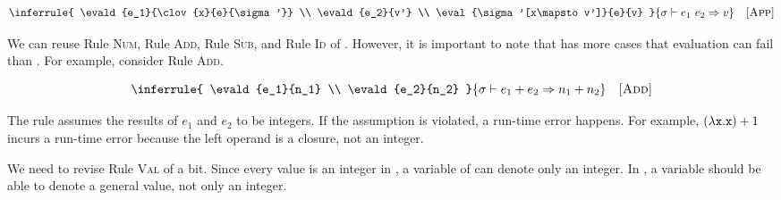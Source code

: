 
\vspace{-1em}

\[
  \inferrule
  {
    \evald{e_1}{\clov{x}{e}{\sigma'}} \\
    \evald{e_2}{v'} \\
    \eval{\sigma'[x\mapsto v']}{e}{v}
  }
  { \evald{\eapp{e_1}{e_2}}{v} }
  \quad\textsc{[App]}
\]

We can reuse Rule \textsc{Num}, Rule \textsc{Add}, Rule \textsc{Sub}, and Rule \textsc{Id} of
\plang. However, it is important to note that \Lang has more
cases that evaluation can fail than \plang. For example, consider Rule \textsc{Add}.


\vspace{-1em}

\[
  \inferrule
  {
    \evald{e_1}{n_1} \\
    \evald{e_2}{n_2}
  }
  { \evald{\eadd{e_1}{e_2}}{n_1+n_2} }
  \quad\textsc{[Add]}
\]

The rule assumes the results of $e_1$ and $e_2$ to be integers. If the
assumption is violated, a run-time error happens. For example,
$(\lambda\texttt{x}.\texttt{x})+1$ incurs a run-time error because the left operand
is a closure, not an integer.

We need to revise Rule \textsc{Val} of \plang a bit.
Since every value is an integer in \plang, a variable of \plang can denote only
an integer. In \Lang, a variable should be able to denote a general value, not
only an integer.


\vspace{-1em}

